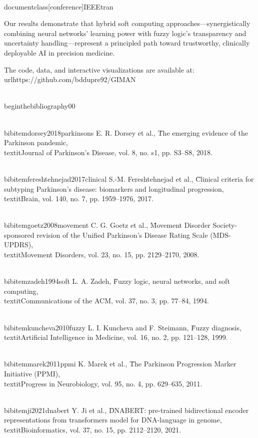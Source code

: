 \\documentclass[conference]{IEEEtran}
\begin{document}
Our results demonstrate that hybrid soft computing approaches—synergistically combining neural networks' learning power with fuzzy logic's transparency and uncertainty handling—represent a principled path toward trustworthy, clinically deployable AI in precision medicine.

The code, data, and interactive visualizations are available at: \\url{https://github.com/bddupre92/GIMAN}

\\begin{thebibliography}{00}

\\bibitem{dorsey2018parkinsons}
E. R. Dorsey et al., \"The emerging evidence of the Parkinson pandemic,\" \\textit{Journal of Parkinson's Disease}, vol. 8, no. s1, pp. S3--S8, 2018.

\\bibitem{fereshtehnejad2017clinical}
S.-M. Fereshtehnejad et al., \"Clinical criteria for subtyping Parkinson's disease: biomarkers and longitudinal progression,\" \\textit{Brain}, vol. 140, no. 7, pp. 1959--1976, 2017.

\\bibitem{goetz2008movement}
C. G. Goetz et al., \"Movement Disorder Society-sponsored revision of the Unified Parkinson's Disease Rating Scale (MDS-UPDRS),\" \\textit{Movement Disorders}, vol. 23, no. 15, pp. 2129--2170, 2008.

\\bibitem{zadeh1994soft}
L. A. Zadeh, \"Fuzzy logic, neural networks, and soft computing,\" \\textit{Communications of the ACM}, vol. 37, no. 3, pp. 77--84, 1994.

\\bibitem{kuncheva2010fuzzy}
L. I. Kuncheva and F. Steimann, \"Fuzzy diagnosis,\" \\textit{Artificial Intelligence in Medicine}, vol. 16, no. 2, pp. 121--128, 1999.

\\bibitem{marek2011ppmi}
K. Marek et al., \"The Parkinson Progression Marker Initiative (PPMI),\" \\textit{Progress in Neurobiology}, vol. 95, no. 4, pp. 629--635, 2011.

\\bibitem{ji2021dnabert}
Y. Ji et al., \"DNABERT: pre-trained bidirectional encoder representations from transformers model for DNA-language in genome,\" \\textit{Bioinformatics}, vol. 37, no. 15, pp. 2112--2120, 2021.
\end{document}
